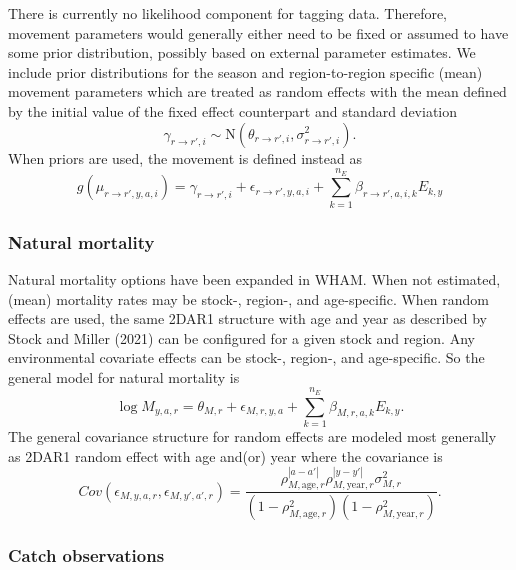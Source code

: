\documentclass[
]{article}
\begin{document}
There is currently no likelihood component for tagging data. Therefore,
movement parameters would generally either need to be fixed or assumed
to have some prior distribution, possibly based on external parameter
estimates. We include prior distributions for the season and
region-to-region specific (mean) movement parameters which are treated
as random effects with the mean defined by the initial value of the
fixed effect counterpart and standard deviation \begin{equation*}
  \gamma_{r\rightarrow r',i} \sim \text{N}\left(\theta_{r\rightarrow r',i}, \sigma^2_{r\rightarrow r',i}\right).
  \end{equation*} When priors are used, the movement is defined instead
as \begin{equation*}
  g(\mu_{r\rightarrow r',y,a,i}) = \gamma_{r\rightarrow r',i} + \epsilon_{r\rightarrow r',y,a,i} + \sum^{n_E}_{k=1} \beta_{r\rightarrow r',a,i,k} E_{k,y} 
  \end{equation*}

\hypertarget{natural-mortality}{%
\subsubsection*{Natural mortality}\label{natural-mortality}}

Natural mortality options have been expanded in WHAM. When not
estimated, (mean) mortality rates may be stock-, region-, and
age-specific. When random effects are used, the same 2DAR1 structure
with age and year as described by Stock and Miller (2021) can be
configured for a given stock and region. Any environmental covariate
effects can be stock-, region-, and age-specific. So the general model
for natural mortality is \begin{equation*}
  \log M_{y,a,r} = \theta_{M,r} + \epsilon_{M,r,y,a} + \sum^{n_E}_{k=1} \beta_{M,r,a,k} E_{k,y}.
\end{equation*} The general covariance structure for random effects are
modeled most generally as 2DAR1 random effect with age and(or) year
where the covariance is \begin{equation*}
  Cov\left(\epsilon_{M,y,a,r},\epsilon_{M,y',a',r}\right) =   \frac{\rho_{M,\text{age},r}^{|a-a'|}\rho_{M,\text{year},r}^{|y-y'|}\sigma^2_{M,r}}{\left(1 -  \rho_{M,\text{age},r}^2\right)\left(1 - \rho_{M,\text{year},r}^2\right)}.
\end{equation*}

\hypertarget{catch-observations}{%
\subsubsection*{Catch observations}\label{catch-observations}}
\end{document}

